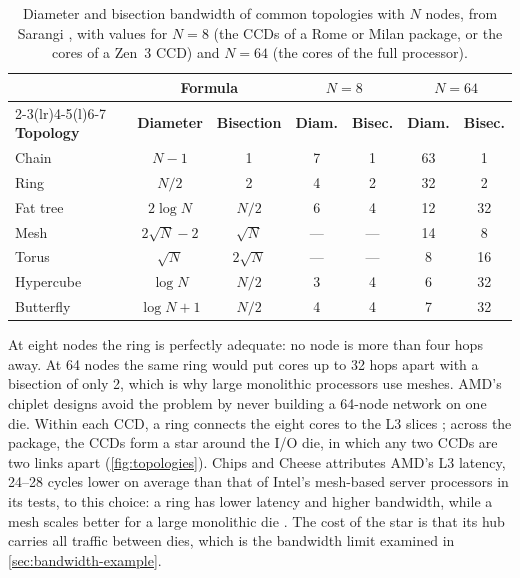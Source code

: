 \begin{table}[htbp]
  \centering
  \caption[Diameter and bisection bandwidth of common topologies]{Diameter and bisection bandwidth of common topologies with $N$ nodes, from Sarangi \cite[sec.~12.6.3]{sarangi2025basic}, with values for $N = 8$ (the CCDs of a Rome or Milan package, or the cores of a Zen~3 CCD) and $N = 64$ (the cores of the full processor).}
  \label{tab:topologies}
  \small
  \begin{tabular}{@{}lcccccc@{}}
    \toprule
    & \multicolumn{2}{c}{\textbf{Formula}} & \multicolumn{2}{c}{$N = 8$} & \multicolumn{2}{c}{$N = 64$} \\
    \cmidrule(lr){2-3}\cmidrule(lr){4-5}\cmidrule(l){6-7}
    \textbf{Topology} & \textbf{Diameter} & \textbf{Bisection} & \textbf{Diam.} & \textbf{Bisec.} & \textbf{Diam.} & \textbf{Bisec.} \\
    \midrule
    Chain & $N-1$ & 1 & 7 & 1 & 63 & 1 \\
    Ring & $N/2$ & 2 & 4 & 2 & 32 & 2 \\
    Fat tree & $2\log N$ & $N/2$ & 6 & 4 & 12 & 32 \\
    Mesh & $2\sqrt{N}-2$ & $\sqrt{N}$ & --- & --- & 14 & 8 \\
    Torus & $\sqrt{N}$ & $2\sqrt{N}$ & --- & --- & 8 & 16 \\
    Hypercube & $\log N$ & $N/2$ & 3 & 4 & 6 & 32 \\
    Butterfly & $\log N + 1$ & $N/2$ & 4 & 4 & 7 & 32 \\
    \bottomrule
  \end{tabular}
\end{table}

At eight nodes the ring is perfectly adequate: no node is more than four hops away. At 64 nodes the same ring would put cores up to 32 hops apart with a bisection of only 2, which is why large monolithic processors use meshes. AMD's chiplet designs avoid the problem by never building a 64-node network on one die. Within each CCD, a ring connects the eight cores to the L3 slices \cite{lamAMDs7950X3DZen2023}; across the package, the CCDs form a star around the I/O die, in which any two CCDs are two links apart (\cref{fig:topologies}). Chips and Cheese attributes AMD's L3 latency, 24--28 cycles lower on average than that of Intel's mesh-based server processors in its tests, to this choice: a ring has lower latency and higher bandwidth, while a mesh scales better for a large monolithic die \cite{cozmaDeepDivingZen2022}. The cost of the star is that its hub carries all traffic between dies, which is the bandwidth limit examined in \cref{sec:bandwidth-example}.

